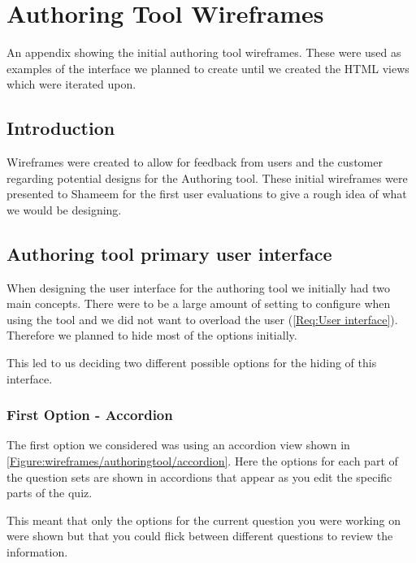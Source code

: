 \chapter{Authoring Tool Wireframes} \label{App:Authoring Tool Wireframes}

\begin{preamble}
	An appendix showing the initial authoring tool wireframes. These were used as examples of the interface we planned to create until we created the HTML views which were iterated upon.
\end{preamble}

\section{Introduction}

Wireframes were created to allow for feedback from users and the customer regarding potential designs for the Authoring tool. These initial wireframes were presented to Shameem for the first user evaluations to give a rough idea of what we would be designing.

\section{Authoring tool primary user interface}

When designing the user interface for the authoring tool we initially had two main concepts. There were to be a large amount of setting to configure when using the tool and we did not want to overload the user (\cref{Req:User interface}). Therefore we planned to hide most of the options initially.

This led to us deciding two different possible options for the hiding of this interface.

\subsection{First Option - Accordion} 

The first option we considered was using an accordion view shown in \autoref{Figure:wireframes/authoringtool/accordion}. Here the options for each part of the question sets are shown in accordions that appear as you edit the specific parts of the quiz.

This meant that only the options for the current question you were working on were shown but that you could flick between different questions to review the information.

